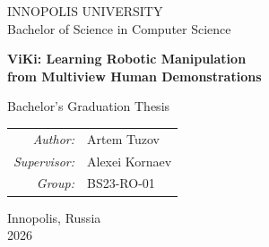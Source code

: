 \documentclass[oneside,final,14pt,a4paper]{extreport}
\theoremstyle{definition}
\theoremstyle{remark}
\begin{document}
% 

\begin{titlepage}
\centering
\vspace*{10mm}
{\large INNOPOLIS UNIVERSITY}\\[2mm]
{\normalsize Bachelor of Science in Computer Science}\\[30mm]

{\LARGE\bfseries ViKi: Learning Robotic Manipulation\\[3mm]
from Multiview Human Demonstrations\par}
\vspace{15mm}

{\large Bachelor's Graduation Thesis}\\[25mm]

\begin{tabular}{rl}
\textit{Author:} & Artem Tuzov\\[4mm]
\textit{Supervisor:} & Alexei Kornaev\\[4mm]
\textit{Group:} & BS23-RO-01\\
\end{tabular}

\vfill
{\normalsize Innopolis, Russia\\ 2026}
\end{titlepage}

\tableofcontents
\listoftables
\listoffigures
\newpage


\setcounter{page}{7}








\printbibliography[heading=bibintoc,title={References}]

\end{document}
